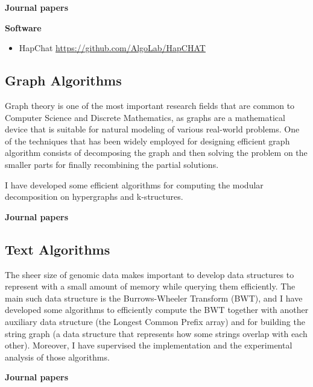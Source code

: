 \documentclass[11pt,a4paper,roman]{moderncv}
\begin{document}
\textbf{Journal papers}

\cite{ciccolellaMALVIRUSIntegratedApplication2022}
\cite{DBLP:journals/bmcbi/BerettaPZVB18}
\cite{DBLP:journals/tcbb/PirolaVBSB12}
\cite{DBLP:journals/tcbb/BonizzoniVDPR10}
\cite{DBLP:journals/ijbra/BonizzoniVDM05}
\cite{DBLP:journals/jcst/BonizzoniVDL03}

\textbf{Software}

\begin{itemize}
\item
      HapChat \url{https://github.com/AlgoLab/HapCHAT}
\end{itemize}

\subsection{Graph Algorithms}\label{graph-algorithms}

Graph theory is one of the most
important research fields that are common to Computer Science and
Discrete Mathematics, as graphs are a mathematical device that is
suitable for natural modeling of various real-world problems. One of the
techniques that has been widely employed for designing efficient graph
algorithm consists of decomposing the graph and then solving the problem
on the smaller parts for finally recombining the partial solutions.

I have developed some efficient algorithms for
computing the modular decomposition on hypergraphs and k-structures.


\textbf{Journal papers}

\cite{DBLP:journals/jal/BonizzoniV99}


\subsection{Text Algorithms}\label{bwt}

The sheer size of genomic data makes important to develop data structures to
represent with a small amount of memory while querying them efficiently.
The main such data structure is the Burrows-Wheeler Transform (BWT), and I have
developed some algorithms to efficiently compute the BWT together with another
auxiliary data structure (the Longest Common Prefix array) and for building the
string graph (a data structure that represents how some strings overlap with
each other).
Moreover, I have supervised the implementation and the experimental analysis of
those algorithms.


\textbf{Journal papers}
\end{document}
